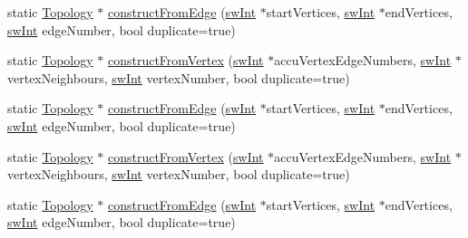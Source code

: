 \begin{DoxyCompactItemize}
\item 
static \mbox{\hyperlink{classUNAT_1_1Topology}{Topology}} $\ast$ \mbox{\hyperlink{classUNAT_1_1Topology_a9765061db14035b0f624872d6855c470}{construct\+From\+Edge}} (\mbox{\hyperlink{include_2swMacro_8h_a113cf5f6b5377cdf3fac6aa4e443e9aa}{sw\+Int}} $\ast$start\+Vertices, \mbox{\hyperlink{include_2swMacro_8h_a113cf5f6b5377cdf3fac6aa4e443e9aa}{sw\+Int}} $\ast$end\+Vertices, \mbox{\hyperlink{include_2swMacro_8h_a113cf5f6b5377cdf3fac6aa4e443e9aa}{sw\+Int}} edge\+Number, bool duplicate=true)
\item 
static \mbox{\hyperlink{classUNAT_1_1Topology}{Topology}} $\ast$ \mbox{\hyperlink{classUNAT_1_1Topology_aebafdfdace5d76dbfc354183a3cddee5}{construct\+From\+Vertex}} (\mbox{\hyperlink{include_2swMacro_8h_a113cf5f6b5377cdf3fac6aa4e443e9aa}{sw\+Int}} $\ast$accu\+Vertex\+Edge\+Numbers, \mbox{\hyperlink{include_2swMacro_8h_a113cf5f6b5377cdf3fac6aa4e443e9aa}{sw\+Int}} $\ast$vertex\+Neighbours, \mbox{\hyperlink{include_2swMacro_8h_a113cf5f6b5377cdf3fac6aa4e443e9aa}{sw\+Int}} vertex\+Number, bool duplicate=true)
\item 
static \mbox{\hyperlink{classUNAT_1_1Topology}{Topology}} $\ast$ \mbox{\hyperlink{classUNAT_1_1Topology_abe162cf4b45297f8f022db63c11140d1}{construct\+From\+Edge}} (\mbox{\hyperlink{include_2swMacro_8h_a113cf5f6b5377cdf3fac6aa4e443e9aa}{sw\+Int}} $\ast$start\+Vertices, \mbox{\hyperlink{include_2swMacro_8h_a113cf5f6b5377cdf3fac6aa4e443e9aa}{sw\+Int}} $\ast$end\+Vertices, \mbox{\hyperlink{include_2swMacro_8h_a113cf5f6b5377cdf3fac6aa4e443e9aa}{sw\+Int}} edge\+Number, bool duplicate=true)
\item 
static \mbox{\hyperlink{classUNAT_1_1Topology}{Topology}} $\ast$ \mbox{\hyperlink{classUNAT_1_1Topology_a01e9873d9c9d7b585632a4fcef1bbd57}{construct\+From\+Vertex}} (\mbox{\hyperlink{include_2swMacro_8h_a113cf5f6b5377cdf3fac6aa4e443e9aa}{sw\+Int}} $\ast$accu\+Vertex\+Edge\+Numbers, \mbox{\hyperlink{include_2swMacro_8h_a113cf5f6b5377cdf3fac6aa4e443e9aa}{sw\+Int}} $\ast$vertex\+Neighbours, \mbox{\hyperlink{include_2swMacro_8h_a113cf5f6b5377cdf3fac6aa4e443e9aa}{sw\+Int}} vertex\+Number, bool duplicate=true)
\item 
static \mbox{\hyperlink{classUNAT_1_1Topology}{Topology}} $\ast$ \mbox{\hyperlink{classUNAT_1_1Topology_abe162cf4b45297f8f022db63c11140d1}{construct\+From\+Edge}} (\mbox{\hyperlink{include_2swMacro_8h_a113cf5f6b5377cdf3fac6aa4e443e9aa}{sw\+Int}} $\ast$start\+Vertices, \mbox{\hyperlink{include_2swMacro_8h_a113cf5f6b5377cdf3fac6aa4e443e9aa}{sw\+Int}} $\ast$end\+Vertices, \mbox{\hyperlink{include_2swMacro_8h_a113cf5f6b5377cdf3fac6aa4e443e9aa}{sw\+Int}} edge\+Number, bool duplicate=true)

\end{DoxyCompactItemize}
